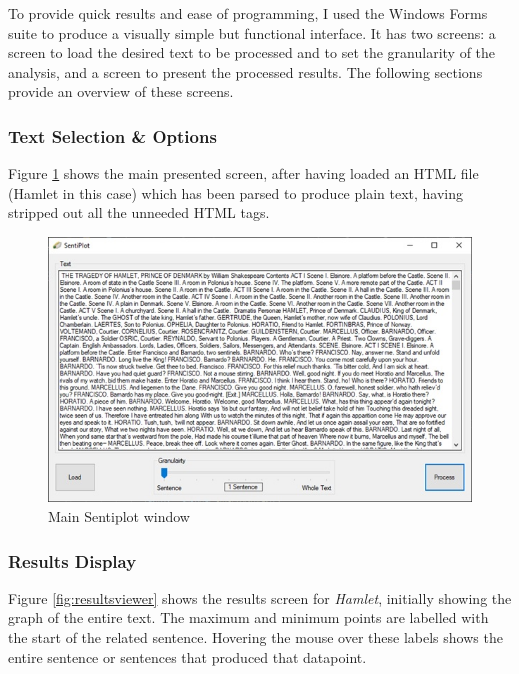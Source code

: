 \documentclass{article}
\begin{document}
{        To provide quick results and ease of programming, I used the Windows Forms suite to produce a visually simple but functional interface. It has two screens: a screen to load the desired text to be processed and to set the granularity of the analysis, and a screen to present the processed results. The following sections provide an overview of these screens.
    \subsubsection{Text Selection \& Options}
    Figure \ref{fig:sentiplot} shows the main presented screen, after having loaded an HTML file (Hamlet in this case) which has been parsed to produce plain text, having stripped out all the unneeded HTML tags.
        \begin{figure}[htbp]
            \includegraphics[width=1\textwidth]{Figures/Misc/sentiplot}
            \caption{Main Sentiplot window}
            \label{fig:sentiplot}
        \end{figure}
    \subsubsection{Results Display}
        Figure \ref{fig:resultsviewer} shows the results screen for \textit{Hamlet}, initially showing the graph of the entire text. The maximum and minimum points are labelled with the start of the related sentence. Hovering the mouse over these labels shows the entire sentence or sentences that produced that datapoint.

}
\end{document}
